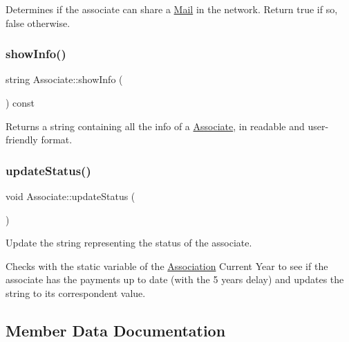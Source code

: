 Determines if the associate can share a \hyperlink{classMail}{Mail} in the network. Return true if so, false otherwise. 

\mbox{\label{classAssociate_a5a47029128dc79e09527552c244da9af}} 
\subsubsection{\texorpdfstring{show\+Info()}{showInfo()}}
{\footnotesize\ttfamily string Associate\+::show\+Info (\begin{DoxyParamCaption}{ }\end{DoxyParamCaption}) const}



Returns a string containing all the info of a \hyperlink{classAssociate}{Associate}, in readable and user-\/friendly format. 

\mbox{\label{classAssociate_aec791e8d29c2c8ccf9769a6ac49a3af5}} 
\subsubsection{\texorpdfstring{update\+Status()}{updateStatus()}}
{\footnotesize\ttfamily void Associate\+::update\+Status (\begin{DoxyParamCaption}{ }\end{DoxyParamCaption})}



Update the string representing the status of the associate. 

Checks with the static variable of the \hyperlink{classAssociation}{Association} Current Year to see if the associate has the payments up to date (with the 5 years delay) and updates the string to its correspondent value. 

\subsection{Member Data Documentation}
\mbox{\label{classAssociate_a7871837a4c80adb4e39f2f67ae1bfce5}} 
